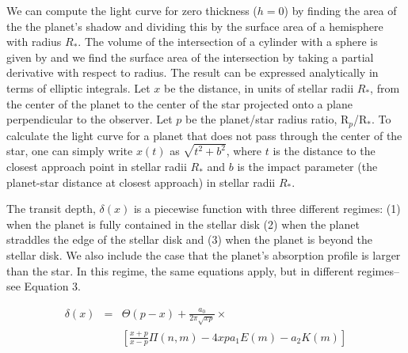 \documentclass[twocolumn]{emulateapj}
\newcommand{\p}{R$_p$/R$_*$}
\begin{document}
We can compute the light curve for zero thickness ($h=0$) by finding the area of the the planet's shadow and dividing this by the surface area of a hemisphere with radius $R_*$. The volume of the intersection of a cylinder with a sphere is given by \citet{lamarche} and we find the surface area of the intersection by taking a partial derivative with respect to radius. The result can be expressed analytically in terms of elliptic integrals.
Let $x$ be the distance, in units of stellar radii $R_*$, from the center of the planet to the center of the star projected onto a plane perpendicular to the observer. Let $p$ be the planet/star radius ratio, \p. To calculate the light curve for a planet that does not pass through the center of the star, one can simply write $x(t)$ as $\sqrt{t^2+b^2}$, where $t$ is the distance to the closest approach point in stellar radii $R_*$ and $b$ is the impact parameter (the planet-star distance at closest approach) in stellar radii $R_*$. 

The transit depth, $\delta (x)$ is a piecewise function with three different regimes: (1) when the planet is fully contained in the stellar disk (2) when the planet straddles the edge of the stellar disk and (3) when the planet is beyond the stellar disk. We also include the case that the planet's absorption profile is larger than the star. In this regime, the same equations apply, but in different regimes--see Equation 3.

\begin{eqnarray}\label{disk}
\delta(x)&=& \Theta (p-x)+\frac{a_0}{2 \pi \sqrt{xp}} \times \\
&&\left[\frac{x+p}{x-p} \Pi(n,m) - 4 x p a_1 E(m) - a_2 K(m) \right] \nonumber
\end{eqnarray}

\end{document}
